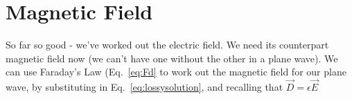 \documentclass{tufte-handout}
\begin{document}
\section{Magnetic Field}
So far so good - we've worked out the electric field. We need its counterpart magnetic field now (we can't have one without the other in a plane wave). We can use Faraday's Law (Eq.~\ref{eq:Fd} to work out the magnetic field for our plane wave, by substituting in Eq.~\ref{eq:lossysolution}, and recalling that $\vec{D} = \epsilon\vec{E}$
\end{document}
